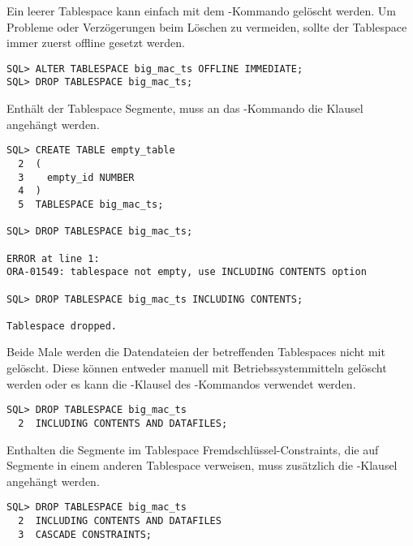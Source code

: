           Ein leerer Tablespace kann einfach mit dem -Kommando gelöscht werden. Um Probleme oder Verzögerungen beim Löschen zu vermeiden, sollte der Tablespace immer zuerst offline gesetzt werden.
          \begin{lstlisting}[caption={Einen leeren Tablespace löschen},label=admin118,language=oracle_sql]
SQL> ALTER TABLESPACE big_mac_ts OFFLINE IMMEDIATE;
SQL> DROP TABLESPACE big_mac_ts;
          \end{lstlisting}
          Enthält der Tablespace Segmente, muss an das -Kommando die Klausel  angehängt werden.
          \begin{lstlisting}[caption={Einen Tablespace mit Inhalt löschen},label=admin119,language=oracle_sql]
SQL> CREATE TABLE empty_table
  2  (
  3    empty_id NUMBER
  4  )
  5  TABLESPACE big_mac_ts;

SQL> DROP TABLESPACE big_mac_ts;

ERROR at line 1:
ORA-01549: tablespace not empty, use INCLUDING CONTENTS option

SQL> DROP TABLESPACE big_mac_ts INCLUDING CONTENTS;

Tablespace dropped.
          \end{lstlisting}
          \begin{merke}
            Beide Male werden die Datendateien der betreffenden Tablespaces nicht mit gelöscht. Diese können entweder manuell mit Betriebssystemmitteln gelöscht werden oder es kann die -Klausel des -Kommandos verwendet werden.
          \end{merke}
          \begin{lstlisting}[caption={Einen Tablespace mit Inhalt und Datendateien löschen},label=admin120,language=oracle_sql]
SQL> DROP TABLESPACE big_mac_ts
  2  INCLUDING CONTENTS AND DATAFILES;
          \end{lstlisting}
          Enthalten die Segmente im Tablespace Fremdschlüssel-Constraints, die auf Segmente in einem anderen Tablespace verweisen, muss zusätzlich die -Klausel angehängt werden.
          \begin{lstlisting}[caption={Einen Tablespace mit Inhalt, Datendateien und Constraints löschen},label=admin121,language=oracle_sql]
SQL> DROP TABLESPACE big_mac_ts
  2  INCLUDING CONTENTS AND DATAFILES
  3  CASCADE CONSTRAINTS;
          \end{lstlisting}
